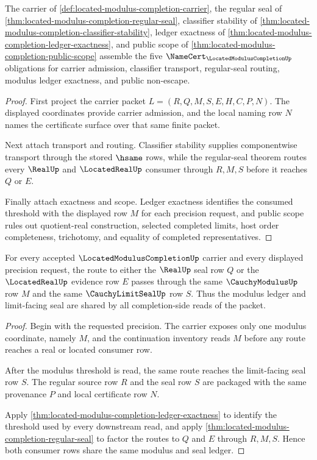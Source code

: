 \begin{theorem}
\label{thm:located-modulus-completion-obligation-routing-package}
The carrier of \autoref{def:located-modulus-completion-carrier}, the regular seal of \autoref{thm:located-modulus-completion-regular-seal}, classifier stability of \autoref{thm:located-modulus-completion-classifier-stability}, ledger exactness of \autoref{thm:located-modulus-completion-ledger-exactness}, and public scope of \autoref{thm:located-modulus-completion-public-scope} assemble the five $\NameCert_{\LocatedModulusCompletionUp}$ obligations for carrier admission, classifier transport, regular-seal routing, modulus ledger exactness, and public non-escape.
\end{theorem}
\begin{proof}
First project the carrier packet $L=(R,Q,M,S,E,H,C,P,N)$. The displayed coordinates provide carrier admission, and the local naming row $N$ names the certificate surface over that same finite packet.

Next attach transport and routing. Classifier stability supplies componentwise transport through the stored $\hsame$ rows, while the regular-seal theorem routes every $\RealUp$ and $\LocatedRealUp$ consumer through $R,M,S$ before it reaches $Q$ or $E$.

Finally attach exactness and scope. Ledger exactness identifies the consumed threshold with the displayed row $M$ for each precision request, and public scope rules out quotient-real construction, selected completed limits, host order completeness, trichotomy, and equality of completed representatives.
\end{proof}

\begin{theorem}
\label{thm:located-modulus-completion-modulus-seal-ledger-scope}
For every accepted $\LocatedModulusCompletionUp$ carrier and every displayed precision request, the route to either the $\RealUp$ seal row $Q$ or the $\LocatedRealUp$ evidence row $E$ passes through the same $\CauchyModulusUp$ row $M$ and the same $\CauchyLimitSealUp$ row $S$. Thus the modulus ledger and limit-facing seal are shared by all completion-side reads of the packet.
\end{theorem}
\begin{proof}
Begin with the requested precision. The carrier exposes only one modulus coordinate, namely $M$, and the continuation inventory reads $M$ before any route reaches a real or located consumer row.

After the modulus threshold is read, the same route reaches the limit-facing seal row $S$. The regular source row $R$ and the seal row $S$ are packaged with the same provenance $P$ and local certificate row $N$.

Apply \autoref{thm:located-modulus-completion-ledger-exactness} to identify the threshold used by every downstream read, and apply \autoref{thm:located-modulus-completion-regular-seal} to factor the routes to $Q$ and $E$ through $R,M,S$. Hence both consumer rows share the same modulus and seal ledger.
\end{proof}

